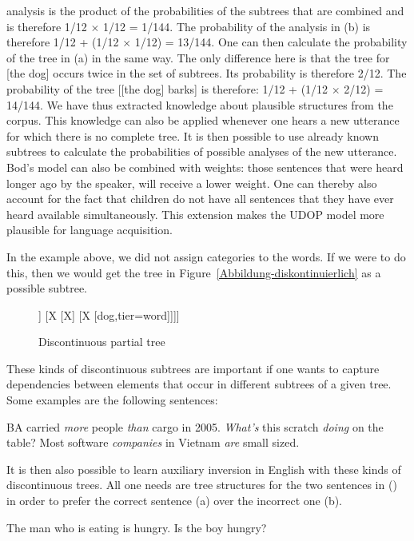 analysis is the product of the probabilities of the subtrees that are combined and is therefore 1/12 $\times$ 1/12 = 1/144.
The probability of the analysis in (b) is therefore 1/12 + (1/12 $\times$ 1/12) = 13/144.
One can then calculate the probability of the tree in (a) in the same way. The only difference here is that the tree for
[the dog] occurs twice in the set of subtrees. Its probability is therefore
 2/12. The probability of the tree [[the dog] barks] is therefore:
 1/12 + (1/12 $\times$ 2/12) = 14/144. We have thus extracted knowledge about plausible structures from the corpus. This knowledge can
also  be applied whenever one hears a new utterance for which there is no complete tree. It is then possible to use already known
 subtrees to calculate the probabilities of possible analyses of the new utterance.
Bod's model can also be combined with weights: those sentences that were heard longer ago by the speaker, will receive a lower weight.
One can thereby also account for the fact that children do not  have all sentences that they have ever heard available simultaneously. 
This extension makes the UDOP model more plausible for language acquisition.

In the example above, we did not assign categories to the words. If we were to do this, then we
would get the tree in Figure~\vref{Abbildung-diskontinuierlich} as a possible
subtree.
\begin{figure}
\centering
\begin{forest}
[X
	[X
		[watch,tier=word]]
	[X
		[X]
		[X
			[dog,tier=word]]]]
\end{forest}
\caption{\label{Abbildung-diskontinuierlich}Discontinuous partial tree}
\end{figure}%
These kinds of discontinuous subtrees are important if one wants to capture dependencies between elements that occur in different subtrees
of a given tree. Some examples are the following sentences:

\eal
\ex BA carried \emph{more} people \emph{than} cargo in 2005.
\ex \emph{What's} this scratch \emph{doing} on the table?
\ex Most software \emph{companies} in Vietnam \emph{are} small sized.
\zl

\noindent
It is then also possible to learn auxiliary inversion in English with these kinds of discontinuous
trees. All one needs are tree structures for the two sentences in () in order to prefer the correct sentence (a) over the incorrect one (b).

\eal
\label{Beispiel-Inversion}
\ex The man who is eating is hungry.
\ex Is the boy hungry?
\zl

